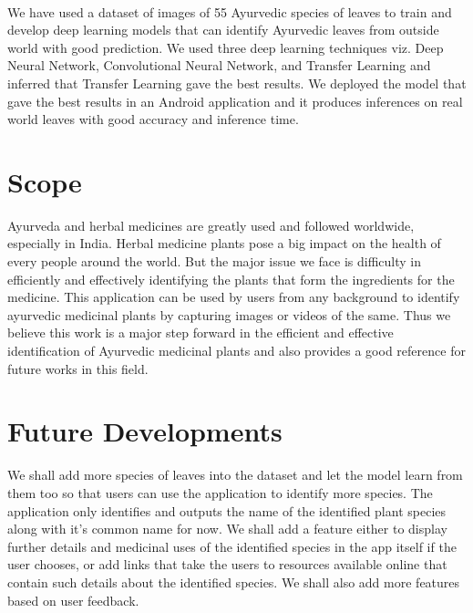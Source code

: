 \paragraph{}
We have used a dataset of images of 55 Ayurvedic species of leaves to train and develop deep learning models that can identify Ayurvedic leaves from outside world with good prediction. We used three deep learning techniques viz.  Deep Neural Network, Convolutional Neural Network, and Transfer Learning and inferred that Transfer Learning gave the best results. We deployed the model that gave the best results in an Android application and it produces inferences on real world leaves with good accuracy and inference time.

\section{Scope}
Ayurveda and herbal medicines are greatly used and followed worldwide, especially in India. Herbal medicine plants pose a big impact on the health of every people around the world.  But the major issue we face is difficulty in efficiently and effectively identifying the plants that form the ingredients for the medicine.
This application can be used by users from any background to identify ayurvedic medicinal plants by capturing images or videos of the same.
Thus we believe this work is a major step forward in the efficient and effective identification of Ayurvedic medicinal plants and also provides a good reference for future works in this field.

\section{Future Developments}
We shall add more species of leaves into the dataset and let the model learn from them too so that users can use the application to identify more species. The application only identifies and outputs the name of the identified plant species along with it's common name for now. We shall add a feature either to display further details and medicinal uses of the identified species in the app itself if the user chooses, or add links that take the users to resources available online that contain such details about the identified species. We shall also add more features based on user feedback.



